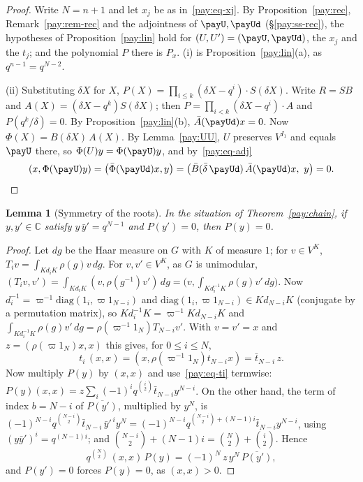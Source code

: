 \documentclass[10pt]{amsart}
\newtheorem{lemma}[theorem]{Lemma}
\theoremstyle{definition}
\theoremstyle{remark}
\newcommand{\C}{\mathbb C}
\begin{document}
\begin{proof}
Write $N=n+1$ and let $x_j$ be as in~\eqref{pay:eq-xj}. By Proposition~\ref{pay:rec},
Remark~\ref{pay:rem-rec} and the adjointness of $\payU,\payUd$ (\S\ref{pay:ss-rec}), the hypotheses of
Proposition~\ref{pay:lin} hold for $(U,U')=(\payU,\payUd)$, the $x_j$ and the $t_j$; and the polynomial
$P$ there is $P_x$. (i) is Proposition~\ref{pay:lin}(a), as $q^{n-1}=q^{N-2}$.

(ii) Substituting $\delta X$ for $X$, $P(X)=\prod_{i\le k}(\delta X-q^i)\cdot S(\delta X)$. Write $R=SB$ and $A(X)=(\delta X-
q^k)S(\delta X)$; then $P=\prod_{i<k}(\delta X-q^i)\cdot A$ and $P(q^k/\delta)=0$. By Proposition~\ref{pay:lin}(b),
$\bar A(\payUd)x=0$. Now $\Phi(X)=B(\delta X)\,A(X)$. By Lemma~\ref{pay:UU}, $U$ preserves $V^{I_1}$ and equals
$\payU$ there, so $\Phi(U)y=\Phi(\payU)y$, and by~\eqref{pay:eq-adj}
\[
(x,\Phi(\payU)y)=\bigl(\bar\Phi(\payUd)x,y\bigr)=\bigl(\bar B(\bar \delta\,\payUd)\,\bar A(\payUd)x,\ y\bigr)=0 .
\qedhere
\]
\end{proof}

\begin{lemma}[Symmetry of the roots]\label{pay:sym}
In the situation of Theorem~\ref{pay:chain}, if $y,y'\in\C$ satisfy $y\,\bar y'=q^{N-1}$ and
$P(y')=0$, then $P(y)=0$.
\end{lemma}
\begin{proof}
Let $dg$ be the Haar measure on $G$ with $K$ of measure $1$; for $v\in V^K$, $T_iv=\int_{Kd_iK}\rho(g)v
\,dg$. For $v,v'\in V^K$, as $G$ is unimodular,
$(T_iv,v')=\int_{Kd_iK}(v,\rho(g^{-1})v')\,dg=\bigl(v,\int_{Kd_i^{-1}K}\rho(g)v'\,dg\bigr)$. Now
$d_i^{-1}=\varpi^{-1}\mathrm{diag}(1_i,\varpi1_{N-i})$ and $\mathrm{diag}(1_i,\varpi1_{N-i})\in
Kd_{N-i}K$ (conjugate by a permutation matrix), so $Kd_i^{-1}K=\varpi^{-1}Kd_{N-i}K$ and
$\int_{Kd_i^{-1}K}\rho(g)v'\,dg=\rho(\varpi^{-1}1_N)T_{N-i}v'$. With $v=v'=x$ and $z=(\rho(\varpi1_N)x,
x)$ this gives, for $0\le i\le N$,
\begin{equation}\label{pay:eq-ti}
t_i\,(x,x)=(x,\rho(\varpi^{-1}1_N)t_{N-i}x)=\bar t_{N-i}\,z .
\end{equation}
Now multiply $P(y)$ by $(x,x)$ and use~\eqref{pay:eq-ti} termwise:
$P(y)(x,x)=z\sum_i(-1)^iq^{\binom i2}\bar t_{N-i}y^{N-i}$. On the other hand, the term of index $b=N-i$
of $\overline{P(y')}$, multiplied by $y^N$, is
$(-1)^{N-i}q^{\binom{N-i}2}\bar t_{N-i}\,\bar y'^{\,i}y^N=(-1)^{N-i}q^{\binom{N-i}2+(N-1)i}\bar t_{N-i}
y^{N-i}$, using $(y\bar y')^i=q^{(N-1)i}$; and $\binom{N-i}2+(N-1)i=\binom N2+\binom i2$. Hence
\[
q^{\binom N2}\,(x,x)\,P(y)=(-1)^N\,z\,y^N\,\overline{P(y')} ,
\]
and $P(y')=0$ forces $P(y)=0$, as $(x,x)>0$.
\end{proof}
\end{document}
